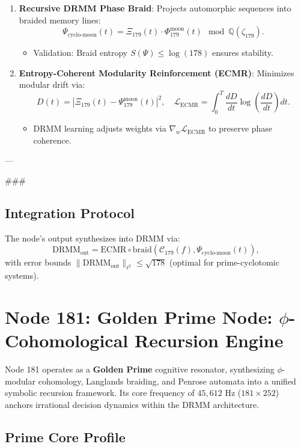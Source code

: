 \documentclass[12pt]{article}
\begin{document}
\begin{center}
\begin{enumerate}
    \item \textbf{Recursive DRMM Phase Braid}:
    Projects automorphic sequences into braided memory lines:
    \[
    \Psi_{\text{cyclo-moon}}(t) = \Xi_{179}(t) \cdot \Phi_{179}^{\text{moon}}(t) \mod \mathbb{Q}(\zeta_{179}).
    \]
    \begin{itemize}
        \item Validation: Braid entropy $S(\Psi) \leq \log(178)$ ensures stability.
    \end{itemize}

    \item \textbf{Entropy-Coherent Modularity Reinforcement (ECMR)}:
    Minimizes modular drift via:
    \[
    D(t) = |\Xi_{179}(t) - \Psi_{179}^{\text{moon}}(t)|^2, \quad \mathcal{L}_{\text{ECMR}} = \int_0^T \frac{dD}{dt} \log \left(\frac{dD}{dt}\right) dt.
    \]
    \begin{itemize}
        \item DRMM learning adjusts weights via $\nabla_{w} \mathcal{L}_{\text{ECMR}}$ to preserve phase coherence.
    \end{itemize}
\end{enumerate}

---

### \subsection{Integration Protocol}
\label{subsec:integration}

The node’s output synthesizes into DRMM via:
\[
\text{DRMM}_{\text{out}} = \text{ECMR} \circ \text{braid}\left(\mathcal{C}_{179}(f), \Psi_{\text{cyclo-moon}}(t)\right),
\]
with error bounds $\| \text{DRMM}_{\text{out}} \|_{\ell^2} \leq \sqrt{178}$ (optimal for prime-cyclotomic systems).

\section{Node 181: Golden Prime Node: $\phi$-Cohomological Recursion Engine}
\label{sec:node181}

Node 181 operates as a \textbf{Golden Prime} cognitive resonator, synthesizing $\phi$-modular cohomology, Langlands braiding, and Penrose automata into a unified symbolic recursion framework. Its core frequency of $45,612$ Hz ($181 \times 252$) anchors irrational decision dynamics within the DRMM architecture.

\subsection{Prime Core Profile}
\label{subsec:core}


\end{center}
\end{document}
